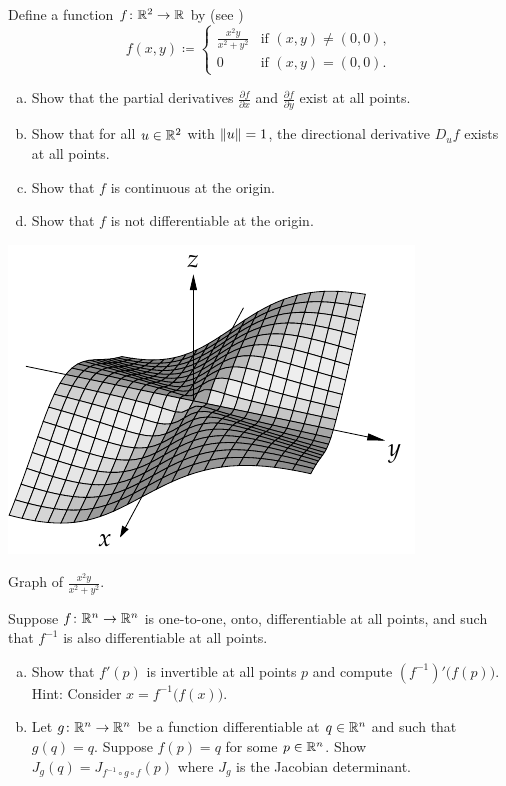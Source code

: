 \begin{samepage}
\begin{exercise}
Define a function $f \colon {\mathbb{R}}^2 \to {\mathbb{R}}$ by
(see )
\begin{equation*}
f(x,y)
\coloneqq
\begin{cases}
\frac{x^2y}{x^2+y^2} & \text{if } (x,y) \not= (0,0), \\
0                    & \text{if } (x,y) = (0,0).
\end{cases}
\end{equation*}
\begin{enumerate}[a)]
\item
Show that the partial derivatives 
$\frac{\partial f}{\partial x}$ and
$\frac{\partial f}{\partial y}$ exist at all points.
\item
Show that for all $u \in {\mathbb{R}}^2$ with $\lVert {u} \rVert=1$, the directional
derivative $D_u f$ exists at all points.
\item
Show that $f$ is continuous at the origin.
\item
Show that $f$ is not differentiable at the origin.
\end{enumerate}
\end{exercise}
\end{samepage}

\begin{myfigureht}
\includegraphics{figures/xsqyxsqysq}
\caption{Graph of $\frac{x^2y}{x^2+y^2}$.\label{fig:xsqyxsqysq}}
\end{myfigureht}

\begin{samepage}
\begin{exercise}
Suppose $f \colon {\mathbb{R}}^n \to {\mathbb{R}}^n$ is one-to-one, onto, differentiable at all
points, and such that $f^{-1}$ is also differentiable at all points.
\begin{enumerate}[a)]
\item
Show that $f'(p)$ is invertible at all points $p$ and compute
${(f^{-1})}'\bigl(f(p)\bigr)$.  Hint: Consider $x = f^{-1}\bigl(f(x)\bigr)$.
\item
Let $g \colon {\mathbb{R}}^n \to {\mathbb{R}}^n$ be a function differentiable at $q \in {\mathbb{R}}^n$
and such that $g(q)=q$.  Suppose $f(p) = q$ for some $p \in {\mathbb{R}}^n$.
Show $J_g(q) = J_{f^{-1} \circ g \circ f}(p)$ where $J_g$ is the Jacobian
determinant.
\end{enumerate}
\end{exercise}
\end{samepage}

